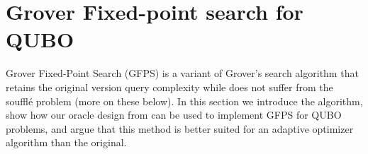 \documentclass[reqno, 10pt]{amsart}
\numberwithin{equation}{section}                %
\begin{document}
\bigskip

\section{Grover Fixed-point search for QUBO}
\label{sec:grover_for_qubo}

Grover Fixed-Point Search (GFPS) \cite{yoder_fixed_2014} is a variant of Grover's search algorithm that retains the original version query complexity while does not suffer from the souffl\'e problem (more on these below). In this section we introduce the algorithm, show how our oracle design from  can be used to implement GFPS for QUBO problems, and argue that this method is better suited for an adaptive optimizer algorithm than the original.

\smallskip
\end{document}
